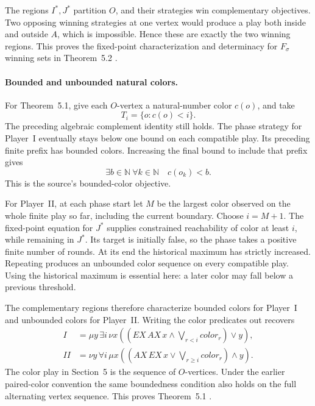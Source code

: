 The regions \(I^*,J^*\)
partition \(O\), and
their strategies win
complementary objectives.
Two opposing winning
strategies at one vertex
would produce a play
both inside and outside
\(A\), which is
impossible.
Hence these are exactly
the two winning regions.
This proves the fixed-point
characterization and determinacy
for \(F_\sigma\) winning
sets in Theorem~5.2
\cite[\S5]{EmersonJutla1991}.

\paragraph{Bounded and unbounded natural colors.}
For Theorem~5.1, give
each \(O\)-vertex a
natural-number color
\(c(o)\), and take
\[
 T_i=\{o:c(o)<i\}.
\]
The preceding algebraic
complement identity still
holds. The phase strategy
for Player~I eventually
stays below one bound
on each compatible play.
Its preceding finite
prefix has bounded
colors.
Increasing the final
bound to include that
prefix gives
\[
 \exists b\in\mathbb N\ \forall k\in\mathbb N
                          \quad c(o_k)<b.
\]
This is the source's
bounded-color objective.

For Player~II, at each
phase start let \(M\)
be the largest color
observed on the whole
finite play so far,
including the current
boundary. Choose
\(i=M+1\).
The fixed-point equation
for \(J^*\) supplies
constrained reachability
of color at least
\(i\), while remaining
in \(J^*\).
Its target is initially
false, so the phase
takes a positive finite
number of rounds.
At its end the
historical maximum has
strictly increased.
Repeating produces an
unbounded color sequence
on every compatible
play.
Using the historical
maximum is essential
here: a later color
may fall below a
previous threshold.

The complementary regions
therefore characterize bounded
colors for Player~I and
unbounded colors for
Player~II. Writing the
color predicates out
recovers
\[
\begin{aligned}
 I&=\mu y\,\exists i\,\nu x
       \left(\left(EX\,AX\,x\land
                    \bigvee_{r<i}color_r\right)\lor y\right),\\
 II&=\nu y\,\forall i\,\mu x
       \left(\left(AX\,EX\,x\lor
                    \bigvee_{r\geq i}color_r\right)\land y\right).
\end{aligned}
\]
The color play in
Section~5 is the sequence
of \(O\)-vertices.
Under the earlier paired-color
convention the same
boundedness condition also
holds on the full
alternating vertex sequence.
This proves Theorem~5.1
\cite[\S5]{EmersonJutla1991}.

